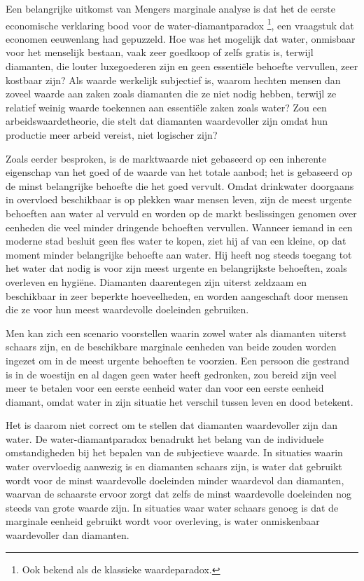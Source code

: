 \documentclass[
  a5paper,
  smalldemyvopaper,11pt,twoside,onecolumn,openright,extrafontsizes,
hidelinks]{memoir}
\begin{document}
Een belangrijke uitkomst van Mengers marginale analyse is dat het de
eerste economische verklaring bood voor de water-diamantparadox
\footnote{Ook bekend als de klassieke waardeparadox.}, een vraagstuk dat
economen eeuwenlang had gepuzzeld. Hoe was het mogelijk dat water,
onmisbaar voor het menselijk bestaan, vaak zeer goedkoop of zelfs gratis
is, terwijl diamanten, die louter luxegoederen zijn en geen essentiële
behoefte vervullen, zeer kostbaar zijn? Als waarde werkelijk subjectief
is, waarom hechten mensen dan zoveel waarde aan zaken zoals diamanten
die ze niet nodig hebben, terwijl ze relatief weinig waarde toekennen
aan essentiële zaken zoals water? Zou een arbeidswaardetheorie, die
stelt dat diamanten waardevoller zijn omdat hun productie meer arbeid
vereist, niet logischer zijn?

Zoals eerder besproken, is de marktwaarde niet gebaseerd op een
inherente eigenschap van het goed of de waarde van het totale aanbod;
het is gebaseerd op de minst belangrijke behoefte die het goed vervult.
Omdat drinkwater doorgaans in overvloed beschikbaar is op plekken waar
mensen leven, zijn de meest urgente behoeften aan water al vervuld en
worden op de markt beslissingen genomen over eenheden die veel minder
dringende behoeften vervullen. Wanneer iemand in een moderne stad
besluit geen fles water te kopen, ziet hij af van een kleine, op dat
moment minder belangrijke behoefte aan water. Hij heeft nog steeds
toegang tot het water dat nodig is voor zijn meest urgente en
belangrijkste behoeften, zoals overleven en hygiëne. Diamanten
daarentegen zijn uiterst zeldzaam en beschikbaar in zeer beperkte
hoeveelheden, en worden aangeschaft door mensen die ze voor hun meest
waardevolle doeleinden gebruiken.

Men kan zich een scenario voorstellen waarin zowel water als diamanten
uiterst schaars zijn, en de beschikbare marginale eenheden van beide
zouden worden ingezet om in de meest urgente behoeften te voorzien. Een
persoon die gestrand is in de woestijn en al dagen geen water heeft
gedronken, zou bereid zijn veel meer te betalen voor een eerste eenheid
water dan voor een eerste eenheid diamant, omdat water in zijn situatie
het verschil tussen leven en dood betekent.

Het is daarom niet correct om te stellen dat diamanten waardevoller zijn
dan water. De water-diamantparadox benadrukt het belang van de
individuele omstandigheden bij het bepalen van de subjectieve waarde. In
situaties waarin water overvloedig aanwezig is en diamanten schaars
zijn, is water dat gebruikt wordt voor de minst waardevolle doeleinden
minder waardevol dan diamanten, waarvan de schaarste ervoor zorgt dat
zelfs de minst waardevolle doeleinden nog steeds van grote waarde zijn.
In situaties waar water schaars genoeg is dat de marginale eenheid
gebruikt wordt voor overleving, is water onmiskenbaar waardevoller dan
diamanten.
\end{document}
